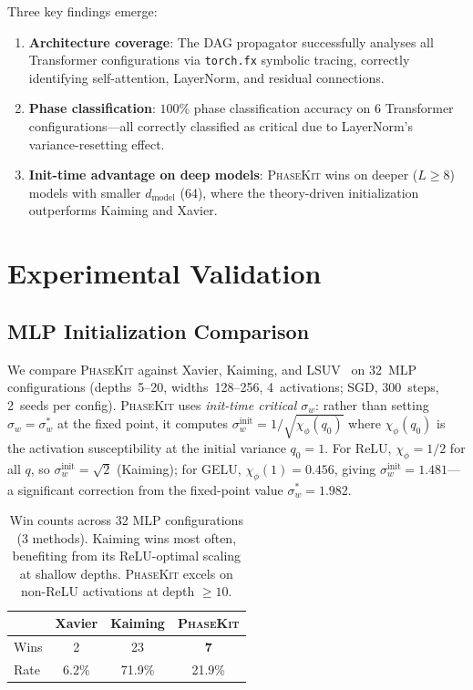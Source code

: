 \documentclass[10pt]{article}
\newcommand{\ToolName}{\textsc{PhaseKit}}
\begin{document}
Three key findings emerge:
\begin{enumerate}[nosep]
    \item \textbf{Architecture coverage}: The DAG propagator successfully analyses all Transformer configurations via \texttt{torch.fx} symbolic tracing, correctly identifying self-attention, LayerNorm, and residual connections.
    \item \textbf{Phase classification}: $100\%$ phase classification accuracy on 6 Transformer configurations---all correctly classified as critical due to LayerNorm's variance-resetting effect.
    \item \textbf{Init-time advantage on deep models}: \ToolName{} wins on deeper ($L \geq 8$) models with smaller $d_{\text{model}}$ (64), where the theory-driven initialization outperforms Kaiming and Xavier.
\end{enumerate}

\section{Experimental Validation}
\label{sec:experiments}

\subsection{MLP Initialization Comparison}
\label{sec:baseline-comparison}

We compare \ToolName{} against Xavier, Kaiming, and LSUV~\cite{mishkin2016all} on 32~MLP configurations (depths~5--20, widths~128--256, 4~activations; SGD, 300~steps, 2~seeds per config).
\ToolName{} uses \emph{init-time critical $\sigma_w$}: rather than setting $\sigma_w = \sigma_w^*$ at the fixed point, it computes $\sigma_w^{\text{init}} = 1/\sqrt{\chi_\phi(q_0)}$ where $\chi_\phi(q_0)$ is the activation susceptibility at the initial variance $q_0 = 1$.
For ReLU, $\chi_\phi = 1/2$ for all $q$, so $\sigma_w^{\text{init}} = \sqrt{2}$ (Kaiming); for GELU, $\chi_\phi(1) = 0.456$, giving $\sigma_w^{\text{init}} = 1.481$---a significant correction from the fixed-point value $\sigma_w^* = 1.982$.

\begin{table}[t]
\centering
\caption{Win counts across 32 MLP configurations (3 methods). Kaiming wins most often, benefiting from its ReLU-optimal scaling at shallow depths. \ToolName{} excels on non-ReLU activations at depth $\geq 10$.}
\label{tab:baseline-wins}
\small
\begin{tabular}{@{}lccc@{}}
\toprule
& \textbf{Xavier} & \textbf{Kaiming} & \textbf{\ToolName{}} \\
\midrule
Wins & 2 & 23 & \textbf{7} \\
Rate & 6.2\% & 71.9\% & 21.9\% \\
\bottomrule
\end{tabular}
\end{table}
\end{document}
